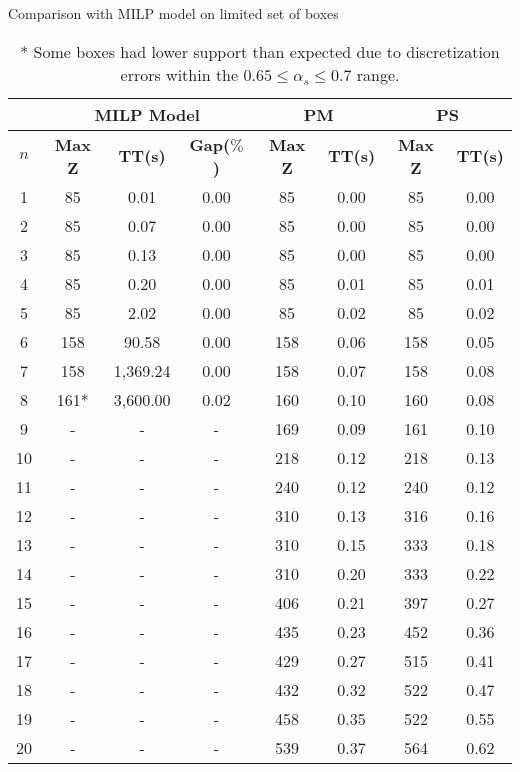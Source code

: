\begin{table}[htbp]
    \centering
    \caption{Comparison with MILP model on limited set of boxes}
    \begin{tabular}{|c|c|c|c|c|c|c|c|}
    \hline
    & \multicolumn{ 3}{c|}{\textbf{MILP Model}} & \multicolumn{ 2}{c|}{\textbf{PM}} & \multicolumn{ 2}{c|}{\textbf{PS}} \\ \hline
    \textbf{$n$} & \textbf{Max Z} & \textbf{TT(s)} & \textbf{Gap($\%$)} & \textbf{Max Z} & \textbf{TT(s)} & \textbf{Max Z} & \textbf{TT(s)} \\ \hline
    1  & 85   & 0.01     & 0.00 & 85  & 0.00 & 85  & 0.00 \\ 
    2  & 85   & 0.07     & 0.00 & 85  & 0.00 & 85  & 0.00 \\ 
    3  & 85   & 0.13     & 0.00 & 85  & 0.00 & 85  & 0.00 \\ 
    4  & 85   & 0.20     & 0.00 & 85  & 0.01 & 85  & 0.01 \\ 
    5  & 85   & 2.02     & 0.00 & 85  & 0.02 & 85  & 0.02 \\ 
    6  & 158  & 90.58    & 0.00 & 158 & 0.06 & 158 & 0.05 \\ 
    7  & 158  & 1,369.24 & 0.00 & 158 & 0.07 & 158 & 0.08 \\ 
    8  & 161* & 3,600.00 & 0.02 & 160 & 0.10 & 160 & 0.08 \\ \hline
    9  & -    & -        & -    & 169 & 0.09 & 161 & 0.10 \\ 
    10 & -    & -        & -    & 218 & 0.12 & 218 & 0.13 \\ 
    11 & -    & -        & -    & 240 & 0.12 & 240 & 0.12 \\ 
    12 & -    & -        & -    & 310 & 0.13 & 316 & 0.16 \\ 
    13 & -    & -        & -    & 310 & 0.15 & 333 & 0.18 \\ 
    14 & -    & -        & -    & 310 & 0.20 & 333 & 0.22 \\ 
    15 & -    & -        & -    & 406 & 0.21 & 397 & 0.27 \\ 
    16 & -    & -        & -    & 435 & 0.23 & 452 & 0.36 \\ 
    17 & -    & -        & -    & 429 & 0.27 & 515 & 0.41 \\ 
    18 & -    & -        & -    & 432 & 0.32 & 522 & 0.47 \\ 
    19 & -    & -        & -    & 458 & 0.35 & 522 & 0.55 \\ 
    20 & -    & -        & -    & 539 & 0.37 & 564 & 0.62 \\ \hline
    \end{tabular}
    \label{exp:model}
    \caption*{* Some boxes had lower support than expected due to discretization errors within the $ 0.65 \le \alpha_s \le 0.7$ range.}
    \end{table}
